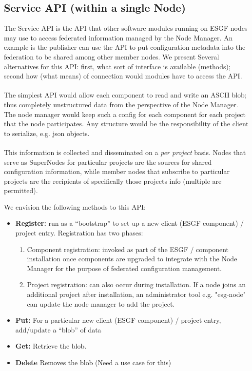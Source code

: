 \documentclass[oneside,12pt]{memoir}
\begin{document}
\subsection{Service API (within a single Node)}

The Service API is the API that other software modules running on ESGF nodes may use to access federated information managed by the Node Manager.  An example is the publisher can use the API to put configuration metadata into the federation to be shared among other member nodes.  We present Several alternatives for this API: first, what sort of interface is available (methods); second how (what means) of connection would modules have to access the API.\\
\\
 The simplest API would allow each component to read and write an ASCII blob; thus completely unstructured data from the perspective of the Node Manager.  The node manager would keep such a config for each component for each project that the node participates.   Any structure would be the responsibility of the client to serialize, e.g. json objects.  \\
 \\
 This information is collected and disseminated on a \emph{per project} basis.  Nodes that serve as SuperNodes for particular projects are the sources for shared configuration information, while member nodes that subscribe to particular projects are the recipients of specifically those projects info (multiple are permitted).
 
 We envision the following methods to this API:
 
 \begin{itemize}
\item
\textbf{Register:}  run as a ``bootstrap'' to set up a new client (ESGF component) / project entry.
Registration has two phases:  \begin{enumerate}
\item
Component registration:  invoked as part of the ESGF / component installation once components are upgraded to integrate with the Node Manager for the purpose of federated configuration management.  
\item
Project registration: can also occur during installation.  If a node joins an additional project after installation, an administrator tool e.g. "esg-node" can update the node manager to add the project.
\end{enumerate}
 \item
 \textbf{Put:} For a particular new client (ESGF component) / project entry, add/update a ``blob'' of data
\item

\textbf{Get:}  Retrieve the blob.
\item
\textbf{Delete}  Removes the blob (Need a use case for this)
   
   \end{itemize}
   
\end{document}
